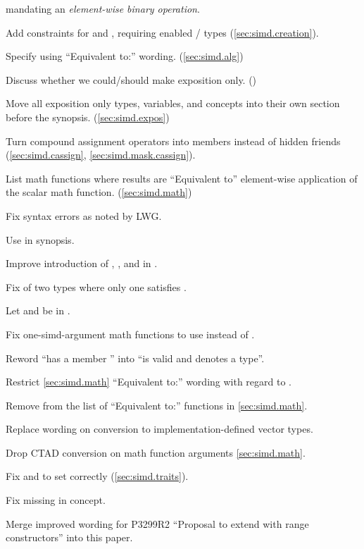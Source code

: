 \begin{revision}
  mandating an \emph{element-wise binary operation}.
\item Add constraints for  and , requiring
  enabled / types
  (\ref{sec:simd.creation}).
\item Specify  using “Equivalent to:” wording.
  (\ref{sec:simd.alg})
\item Discuss whether we could/should make  exposition only.
  ()
\item Move all exposition only types, variables, and concepts into their own
  section before the synopsis. (\ref{sec:simd.expos})
\end{revision}

\begin{revision}
\item Turn compound assignment operators into members instead of hidden friends
  (\ref{sec:simd.cassign}, \ref{sec:simd.mask.cassign}).
\item List math functions where results are “Equivalent to” element-wise application of the scalar math function. (\ref{sec:simd.math})
\item Fix syntax errors as noted by LWG.
\item Use \seebelow in \reductionoperation synopsis.
\item Improve introduction of , , and  in \mathcommonsimd.
\item Fix \mathcommonsimd of two types where only one satisfies \mathfloatingpoint.
\item Let  and  be  in \reductionoperation.
\item Fix one-simd-argument math functions to use  instead of .
\item Reword “has a member ” into “is valid and denotes a type”.
\item Restrict \ref{sec:simd.math} “Equivalent to:” wording with regard to .
\item Remove  from the list of “Equivalent to:” functions in \ref{sec:simd.math}.
\item Replace wording on conversion to implementation-defined vector types.
\item Drop CTAD conversion on math function arguments \ref{sec:simd.math}.
\item Fix  and  to set 
  correctly (\ref{sec:simd.traits}).
\item Fix missing  in \simdfloatingpoint concept.

\end{revision}

\begin{revision}
\item Merge improved wording for P3299R2 “Proposal to extend 
  with range constructors” into this paper.
\end{revision}
